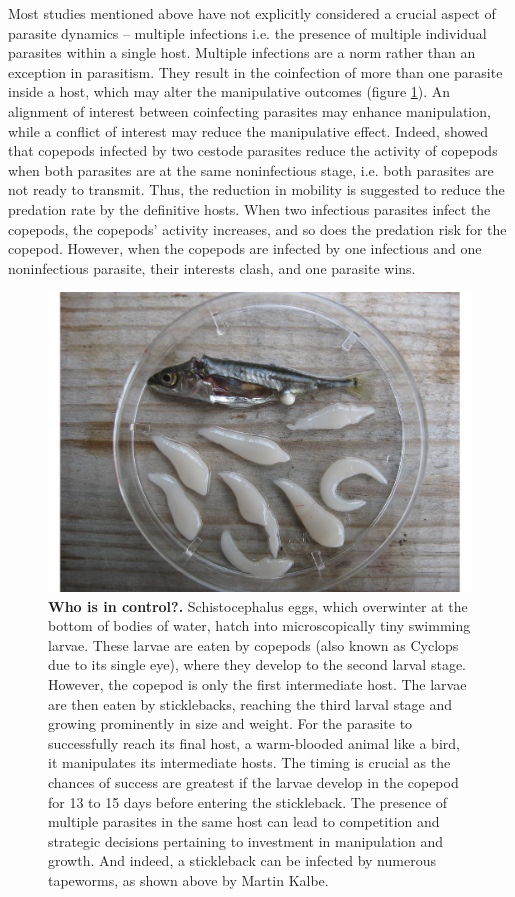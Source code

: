 \documentclass[a4paper]{scrartcl}
\begin{document}
Most studies mentioned above have not explicitly considered a crucial aspect of parasite dynamics -- multiple infections \citep{kalbe:JFB:2002} i.e. the presence of multiple individual parasites within a single host.
Multiple infections are a norm rather than an exception in parasitism. 
They result in the coinfection of more than one parasite inside a host, which may alter the manipulative outcomes (figure \ref{fig:empirical}). 
An alignment of interest between coinfecting parasites may enhance manipulation, while a conflict of interest may reduce the manipulative effect. 
Indeed, \cite{Hafer:2015gl} showed that copepods infected by two cestode parasites reduce the activity of copepods when both parasites are at the same noninfectious stage, i.e. both parasites are not ready to transmit. 
Thus, the reduction in mobility is suggested to reduce the predation rate by the definitive hosts. 
When two infectious parasites infect the copepods, the copepods' activity increases, and so does the predation risk for the copepod. 
However, when the copepods are infected by one infectious and one noninfectious parasite, their interests clash, and one parasite wins. 

\begin{figure}[ht!]
\captionsetup{format=plain}
\centering
\includegraphics[width=0.75\columnwidth]{Figures/Sept_10_ 101.pdf}
\caption{\textbf{Who is in control?.}
Schistocephalus eggs, which overwinter at the bottom of bodies of water, hatch into microscopically tiny swimming larvae. 
These larvae are eaten by copepods (also known as Cyclops due to its single eye), where they develop to the second larval stage. 
However, the copepod is only the first intermediate host. 
The larvae are then eaten by sticklebacks, reaching the third larval stage and growing prominently in size and weight. 
For the parasite to successfully reach its final host, a warm-blooded animal like a bird, it manipulates its intermediate hosts. 
The timing is crucial as the chances of success are greatest if the larvae develop in the copepod for 13 to 15 days before entering the stickleback. 
The presence of multiple parasites in the same host can lead to competition and strategic decisions pertaining to investment in manipulation and growth.
And indeed, a stickleback can be infected by numerous tapeworms, as shown above by Martin Kalbe.
}
\label{fig:empirical}
\end{figure}
\end{document}
